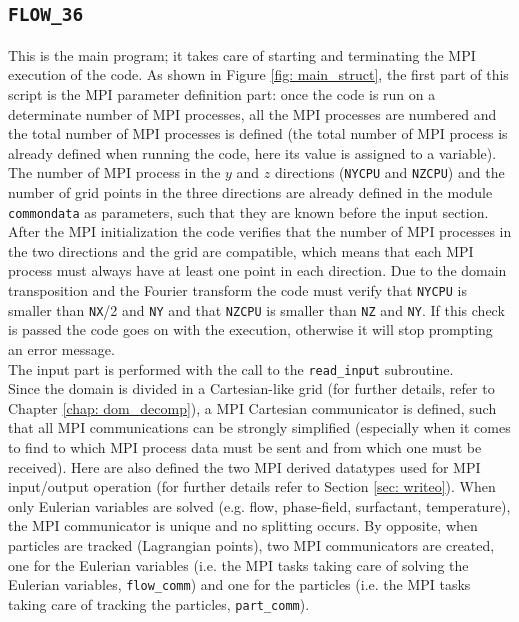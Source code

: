 \subsection{\texttt{FLOW\_36}}
This is the main program; it takes care of starting and terminating the MPI execution of the code. As shown in Figure \ref{fig: main_struct}, the first part of this script is the MPI parameter definition part: once the code is run on a determinate number of MPI processes, all the MPI processes are numbered and the total number of MPI processes is defined (the total number of MPI process is already defined when running the code, here its value is assigned to a variable). 
The number of MPI process in the $y$ and $z$ directions (\texttt{NYCPU} and \texttt{NZCPU}) and the number of grid points in the three directions are already defined in the module \texttt{commondata} as parameters, such that they are known before the input section. 
After the MPI initialization the code verifies that the number of MPI processes in the two directions and the grid are compatible, which means that each MPI process must always have at least one point in each direction. Due to the domain transposition and the Fourier transform the code must verify that \texttt{NYCPU} is smaller than \texttt{NX}/2 and \texttt{NY} and that \texttt{NZCPU} is smaller than \texttt{NZ} and \texttt{NY}. If this check is passed the code goes on with the execution, otherwise it will stop prompting an error message.\\
The input part is performed with the call to the \texttt{read\_input} subroutine.\\
Since the domain is divided in a Cartesian-like grid (for further details, refer to Chapter \ref{chap: dom_decomp}), a MPI Cartesian communicator is defined, such that all MPI communications can be strongly simplified (especially when it comes to find to which MPI process data must be sent and from which one must be received). Here are also defined the two MPI derived datatypes used for MPI input/output operation (for further details refer to Section \ref{sec: writeo}).
When only Eulerian variables are solved (e.g. flow, phase-field, surfactant, temperature), the MPI communicator is unique and no splitting occurs. 
By opposite, when particles are tracked (Lagrangian points), two MPI communicators are created, one for the Eulerian variables (i.e. the MPI tasks taking care of solving the Eulerian variables, \texttt{flow\_comm}) and one for the particles (i.e. the MPI tasks taking care of tracking the particles, \texttt{part\_comm}).\\
